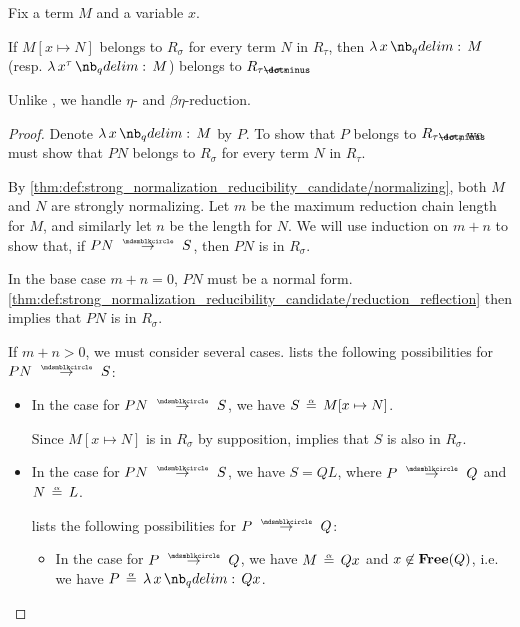 \begin{lemma}\label{thm:reducibility_candidate_abstraction}
  Fix a term \( M \) and a variable \( x \).

  If \( M[x \mapsto N] \) belongs to \( R_\sigma \) for every term \( N \) in \( R_\tau \), then \( \qabs x M \) (resp. \( \qabs {x^\tau} M \)) belongs to \( R_{\tau \synimplies \sigma} \).
\end{lemma}
\begin{comments}
  \item Unlike , we handle \( \eta \)- and \( \beta\eta \)-reduction.
\end{comments}
\begin{proof}
  Denote \( \qabs x M \) by \( P \). To show that \( P \) belongs to \( R_{\tau \synimplies \sigma} \), we must show that \( P N \) belongs to \( R_\sigma \) for every term \( N \) in \( R_\tau \).

  By \ref{thm:def:strong_normalization_reducibility_candidate/normalizing}, both \( M \) and \( N \) are strongly normalizing. Let \( m \) be the maximum reduction chain length for \( M \), and similarly let \( n \) be the length for \( N \). We will use induction on \( m + n \) to show that, if \( P N \pred S \), then \( P N \) is in \( R_\sigma \).

  In the base case \( m + n = 0 \), \( P N \) must be a normal form. \ref{thm:def:strong_normalization_reducibility_candidate/reduction_reflection} then implies that \( P N \) is in \( R_\sigma \).

  If \( m + n > 0 \), we must consider several cases.  lists the following possibilities for \( P N \pred S \):
  \begin{itemize}
    \item In the case  for \( P N \pred S \), we have \( S \aequiv M[x \mapsto N] \).

    Since \( M[x \mapsto N] \) is in \( R_\sigma \) by supposition,  implies that \( S \) is also in \( R_\sigma \).

    \item In the case  for \( P N \pred S \), we have \( S = Q L \), where \( P \pred Q \) and \( N \aequiv L \).

     lists the following possibilities for \( P \pred Q \):
    \begin{itemize}
      \item In the case  for \( P \pred Q \), we have \( M \aequiv Qx \) and \( x \not\in \op*{Free}(Q) \), i.e. we have \( P \aequiv \qabs x Qx \).


\end{itemize}
\end{itemize}
\end{proof}
